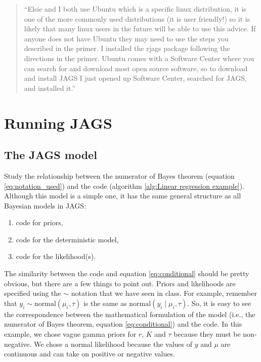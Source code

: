 \documentclass[12pt,english]{article}
\begin{document}
\begin{quotation}
``Elsie and I both use Ubuntu which is a specific linux distribution, it is one of the more commonly used distributions (it is user friendly!) so it is likely that many linux users in the future will be able to use this advice. If anyone does not have Ubuntu they may need to use the steps you described in the primer. I installed the rjags package following the directions in the primer. Ubuntu comes with a Software Center where you can search for and download most open source software, so to download and install JAGS I just opened up Software Center, searched for JAGS, and installed it.''
\end{quotation}


\section{Running JAGS}

\subsection{The JAGS model}

Study the relationship between the numerator of Bayes theorem (equation \ref{eq:notation_used}) and the code (algorithm \ref{alg:Linear regression example}). Although this model is a simple one, it has the same general structure as all Bayesian models in JAGS:

\begin{enumerate}
\item code for priors,
\item code for the deterministic model,
\item code for the likelihood(s).
\end{enumerate}

The similarity between the code and equation \ref{eq:conditional} should be pretty obvious, but there are a few things to point out. Priors and likelihoods are specified using the $\sim$ notation that we have seen in class. For example, remember that $y_{i}  \sim  \textrm{normal}\left(\mu_{i},\tau\right)$ is the same as $\textrm{normal}\left(y_{i}\mid\mu_{i},\tau\right)$. So, it is easy to see the correspondence between the mathematical formulation of the model (i.e., the numerator of Bayes theorem, equation \ref{eq:conditional}) and the code. In this example, we chose vague gamma priors for $r$, $K$ and $\tau$ because they must be non-negative. We chose a normal likelihood because the values of $y$ and $\mu$ are continuous and can take on positive or negative values. 
\end{document}
